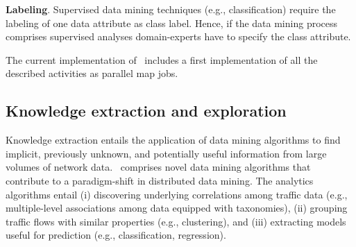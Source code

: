 \textbf{Labeling}. Supervised data mining techniques (e.g., classification) require the labeling of one data attribute 
as class label. Hence, if the data mining process comprises supervised analyses domain-experts have to specify the class attribute. 


The current implementation of \Nemico\ includes a first implementation of all the described activities as parallel map jobs.






\subsection{Knowledge extraction and exploration}
\label{KnowExt}
Knowledge extraction entails the application of data mining algorithms to find implicit, previously unknown, and potentially useful information from large volumes of network data. 
\Nemico\ comprises novel data mining algorithms that contribute to a paradigm-shift in distributed data mining. The analytics algorithms entail (i) discovering underlying correlations among traffic data 
(e.g., multiple-level associations among data equipped with taxonomies), (ii) grouping traffic flows with similar properties (e.g., clustering), and (iii) extracting models useful for prediction (e.g., classification, regression).  
%
%
%

